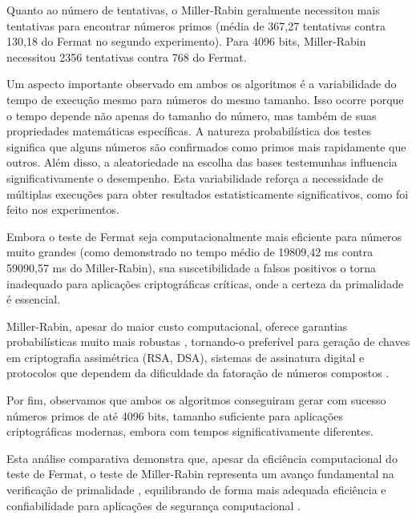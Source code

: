 Quanto ao número de tentativas, o Miller-Rabin geralmente necessitou mais tentativas para encontrar números primos (média de 367,27 tentativas contra 130,18 do Fermat no segundo experimento). Para 4096 bits, Miller-Rabin necessitou 2356 tentativas contra 768 do Fermat.

Um aspecto importante observado em ambos os algoritmos é a variabilidade do tempo de execução mesmo para números do mesmo tamanho. Isso ocorre porque o tempo depende não apenas do tamanho do número, mas também de suas propriedades matemáticas específicas. A natureza probabilística dos testes significa que alguns números são confirmados como primos mais rapidamente que outros. Além disso, a aleatoriedade na escolha das bases testemunhas influencia significativamente o desempenho. Esta variabilidade reforça a necessidade de múltiplas execuções para obter resultados estatisticamente significativos, como foi feito nos experimentos.

Embora o teste de Fermat seja computacionalmente mais eficiente para números muito grandes (como demonstrado no tempo médio de 19809,42 ms contra 59090,57 ms do Miller-Rabin), sua suscetibilidade a falsos positivos o torna inadequado para aplicações criptográficas críticas, onde a certeza da primalidade é essencial.

Miller-Rabin, apesar do maior custo computacional, oferece garantias probabilísticas muito mais robustas \cite{menezes1996handbook_miller}, tornando-o preferível para geração de chaves em criptografia assimétrica (RSA, DSA), sistemas de assinatura digital e protocolos que dependem da dificuldade da fatoração de números compostos \cite{rabin1980probabilistic}.

Por fim, observamos que ambos os algoritmos conseguiram gerar com sucesso números primos de até 4096 bits, tamanho suficiente para aplicações criptográficas modernas, embora com tempos significativamente diferentes.

Esta análise comparativa demonstra que, apesar da eficiência computacional do teste de Fermat, o teste de Miller-Rabin representa um avanço fundamental na verificação de primalidade \cite{menezes1996handbook_miller, yan2009primality}, equilibrando de forma mais adequada eficiência e confiabilidade para aplicações de segurança computacional \cite{shoup2009computational}.

